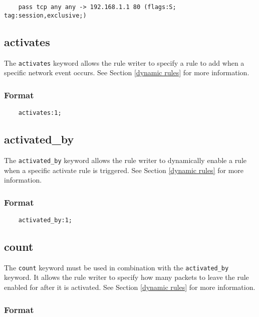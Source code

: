 \documentclass[english]{report}
\begin{document}
\begin{verbatim}
    pass tcp any any -> 192.168.1.1 80 (flags:S; tag:session,exclusive;)
\end{verbatim}

\subsection{activates}

The \texttt{activates} keyword allows the rule writer to specify a rule to add
when a specific network event occurs. See Section \ref{dynamic rules} for more
information.

\subsubsection{Format}

\begin{verbatim}
    activates:1;
\end{verbatim}

\subsection{activated\_by}

The \texttt{activated\_by} keyword allows the rule writer to dynamically enable
a rule when a specific activate rule is triggered.  See Section \ref{dynamic
rules} for more information.

\subsubsection{Format}

\begin{verbatim}
    activated_by:1;
\end{verbatim}

\subsection{count}

The \texttt{count} keyword must be used in combination with the
\texttt{activated\_by} keyword.  It allows the rule writer to specify how many
packets to leave the rule enabled for after it is activated.  See Section
\ref{dynamic rules} for more information.

\subsubsection{Format}
\end{document}
